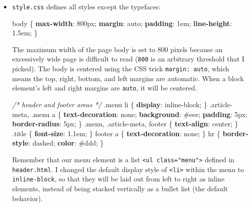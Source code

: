 \documentclass[12pt,]{krantz}
\makeatletter
\newenvironment{Shaded}{\begin{snugshade}}{\end{snugshade}}
\newcommand{\CommentTok}[1]{\textcolor[rgb]{0.56,0.35,0.01}{\textit{#1}}}
\newcommand{\DecValTok}[1]{\textcolor[rgb]{0.00,0.00,0.81}{#1}}
\newcommand{\FunctionTok}[1]{\textcolor[rgb]{0.00,0.00,0.00}{#1}}
\newcommand{\KeywordTok}[1]{\textcolor[rgb]{0.13,0.29,0.53}{\textbf{#1}}}
\newcommand{\NormalTok}[1]{#1}
\newenvironment{kframe}{%
\medskip{}
\setlength{\fboxsep}{.8em}
 \def\at@end@of@kframe{}%
 \ifinner\ifhmode%
  \def\at@end@of@kframe{\end{minipage}}%
  \begin{minipage}{\columnwidth}%
 \fi\fi%
 \def\FrameCommand##1{\hskip\@totalleftmargin \hskip-\fboxsep
 \colorbox{shadecolor}{##1}\hskip-\fboxsep
     \hskip-\linewidth \hskip-\@totalleftmargin \hskip\columnwidth}%
 \MakeFramed {\advance\hsize-\width
   \@totalleftmargin\z@ \linewidth\hsize
   \@setminipage}}%
 {\par\unskip\endMakeFramed%
 \at@end@of@kframe}
\renewenvironment{Shaded}{\begin{kframe}}{\end{kframe}}
\theoremstyle{definition}
\theoremstyle{definition}
\theoremstyle{definition}
\theoremstyle{remark}
\makeatother
\begin{document}
\begin{itemize}
\item
  \texttt{style.css} defines all styles except the typefaces:

\begin{Shaded}
\begin{Highlighting}[]
\NormalTok{body \{}
  \KeywordTok{max-width}\NormalTok{: }\DecValTok{800px}\NormalTok{;}
  \KeywordTok{margin}\NormalTok{: }\DecValTok{auto}\NormalTok{;}
  \KeywordTok{padding}\NormalTok{: }\DecValTok{1em}\NormalTok{;}
  \KeywordTok{line-height}\NormalTok{: }\DecValTok{1.5em}\NormalTok{;}
\NormalTok{\}}
\end{Highlighting}
\end{Shaded}

  The maximum width of the page body is set to 800 pixels because an
  excessively wide page is difficult to read (\texttt{800} is an
  arbitrary threshold that I picked). The body is centered using the CSS
  trick \texttt{margin:\ auto}, which means the top, right, bottom, and
  left margins are automatic. When a block element's left and right
  margins are \texttt{auto}, it will be centered.

\begin{Shaded}
\begin{Highlighting}[]
\CommentTok{/* header and footer areas */}
\FunctionTok{.menu}\NormalTok{ li \{ }\KeywordTok{display}\NormalTok{: }\DecValTok{inline-block}\NormalTok{; \}}
\FunctionTok{.article-meta}\NormalTok{, }\FunctionTok{.menu}\NormalTok{ a \{}
  \KeywordTok{text-decoration}\NormalTok{: }\DecValTok{none}\NormalTok{;}
  \KeywordTok{background}\NormalTok{: }\DecValTok{#eee}\NormalTok{;}
  \KeywordTok{padding}\NormalTok{: }\DecValTok{5px}\NormalTok{;}
  \KeywordTok{border-radius}\NormalTok{: }\DecValTok{5px}\NormalTok{;}
\NormalTok{\}}
\FunctionTok{.menu}\NormalTok{, }\FunctionTok{.article-meta}\NormalTok{, footer \{ }\KeywordTok{text-align}\NormalTok{: }\DecValTok{center}\NormalTok{; \}}
\FunctionTok{.title}\NormalTok{ \{ }\KeywordTok{font-size}\NormalTok{: }\DecValTok{1.1em}\NormalTok{; \}}
\NormalTok{footer a \{ }\KeywordTok{text-decoration}\NormalTok{: }\DecValTok{none}\NormalTok{; \}}
\NormalTok{hr \{}
  \KeywordTok{border-style}\NormalTok{: }\DecValTok{dashed}\NormalTok{;}
  \KeywordTok{color}\NormalTok{: }\DecValTok{#ddd}\NormalTok{;}
\NormalTok{\}}
\end{Highlighting}
\end{Shaded}

  Remember that our menu element is a list
  \texttt{\textless{}ul\ class="menu"\textgreater{}} defined in
  \texttt{header.html}. I changed the default display style of
  \texttt{\textless{}li\textgreater{}} within the menu to
  \texttt{inline-block}, so that they will be laid out from left to
  right as inline elements, instead of being stacked vertically as a
  bullet list (the default behavior).


\end{itemize}
\end{document}
